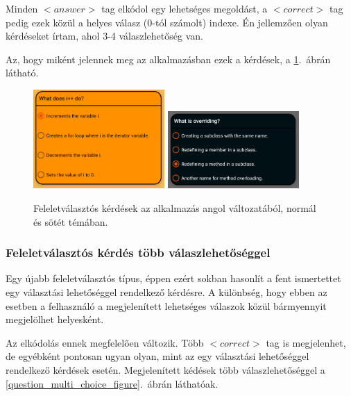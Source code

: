 \documentclass[12pt,a4paper]{article}
\begin{document}
	Minden $<answer>$ tag elkódol egy lehetséges megoldást, a $<correct>$ tag pedig ezek közül a helyes válasz (0-tól számolt) indexe. Én jellemzően olyan kérdéseket írtam, ahol 3-4 válaszlehetőség van. 
	
	Az, hogy miként jelennek meg az alkalmazásban ezek a kérdések, a \ref{question_single_choice_figure}.\ ábrán látható.
	
	\begin{figure}[h!]
		\centering
		\includegraphics[width=5cm]{question_single_choice}
		\includegraphics[width=5cm]{question_single_choice_dark}
		\caption{Feleletválasztós kérdések az alkalmazás angol változatából, normál és sötét témában.}
		\label{question_single_choice_figure}
	\end{figure}
	
	\subsubsection{Feleletválasztós kérdés több válaszlehetőséggel}
	
	Egy újabb feleletválasztós típus, éppen ezért sokban hasonlít a fent ismertettet egy választási lehetőséggel rendelkező kérdésre. A különbség, hogy ebben az esetben a felhasználó a megjelenített lehetséges válaszok közül bármyennyit megjelölhet helyesként.
	
	Az elkódolás ennek megfelelően változik. Több $<correct>$ tag is megjelenhet, de egyébként pontosan ugyan olyan, mint az egy választási lehetőséggel rendelkező kérdések esetén. Megjelenített kédések több válaszlehetőséggel a \ref{question_multi_choice_figure}.\ ábrán láthatóak.
	
\end{document}
